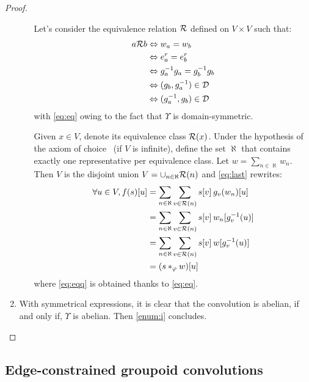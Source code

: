 \begin{proof}
\begin{enumerate}[label=(\roman*)]
\begin{enumerate}
    Let's consider the equivalence relation $\ccr$ defined on $V \times V$ such that:
    \begin{align}
    a \ccr b & \Leftrightarrow    w_a = w_b\nonumber\\
            & \Leftrightarrow e^r_a = e^r_b\nonumber\\
            & \Leftrightarrow g_a^{-1}g_a = g_b^{-1}g_b\nonumber\\
            & \Leftrightarrow (g_b, g_a^{-1}) \in \cd\nonumber\\
            & \Leftrightarrow (g_a^{-1}, g_b) \in \cd \label{eq:eq}
    \end{align}
    with \eqref{eq:eq} owing to the fact that $\Upsilon$ is domain-symmetric.

    Given $x\in V$, denote its equivalence class $\ccr(x)$. Under the hypothesis of the axiom of choice~\citep{zermelo1904beweis} (if $V$ is infinite), define the set $\aleph$ that contains exactly one representative per equivalence class. Let $w = \sum_{n \in \aleph} w_n$. Then $V$ is the disjoint union $V = \displaystyle\cup_{n \in \aleph} \ccr(n)$ and \eqref{eq:last} rewrites:
    \begin{align}
    \forall u \in V, f(s)[u] & = \displaystyle\sum_{n \in \aleph}\sum_{v \in \ccr(n)} s[v] \h{2} g_v(w_n)[u]\nonumber\\
    	 				  & = \displaystyle\sum_{n \in \aleph}\sum_{v \in \ccr(n)} s[v] \h{2} w_n[g_v^{-1}(u)]\nonumber\\
    	 				  & = \displaystyle\sum_{n \in \aleph}\sum_{v \in \ccr(n)} s[v] \h{2} w[g_v^{-1}(u)]\label{eq:eqq}\\
    	 				  & = (s \ast_\varphi w)[u]\nonumber
    \end{align}
    where \eqref{eq:eqq} is obtained thanks to \eqref{eq:eq}.
  \end{enumerate}

  \item With symmetrical expressions, it is clear that the convolution is abelian, if and only if, $\Upsilon$ is abelian. Then \ref{enum:i} concludes.
\end{enumerate}
\end{proof}

\subsection{Edge-constrained groupoid convolutions}


